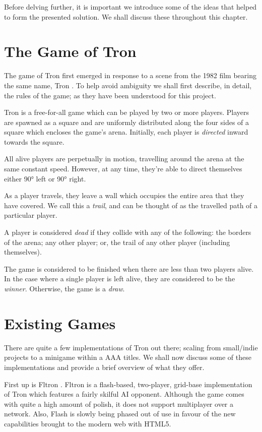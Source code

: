 \documentclass[class=article, crop=false]{standalone}
\begin{document}
	Before delving further, it is important we introduce some of the ideas that helped to form the presented solution. We shall discuss these throughout this chapter.

	\section{The Game of Tron}
		The game of Tron first emerged in response to a scene from the 1982 film bearing the same name, Tron \parencite{TronLightCycleBattle}. To help avoid ambiguity we shall first describe, in detail, the rules of the game; as they have been understood for this project.

		Tron is a free-for-all game which can be played by two or more players. Players are spawned as a square and are uniformly distributed along the four sides of a square which encloses the game's arena. Initially, each player is \emph{directed} inward towards the square.

		All alive players are perpetually in motion, travelling around the arena at the same constant speed. However, at any time, they're able to direct themselves either 90\si{\degree} left or 90\si{\degree} right.

		As a player travels, they leave a wall which occupies the entire area that they have covered. We call this a \emph{trail}, and can be thought of as the travelled path of a particular player.

		A player is considered \emph{dead} if they collide with any of the following: the borders of the arena; any other player; or, the trail of any other player (including themselves).

		The game is considered to be finished when there are less than two players alive. In the case where a single player is left alive, they are considered to be the \emph{winner}. Otherwise, the game is a \emph{draw}.

	\section{Existing Games}
		There are quite a few implementations of Tron out there; scaling from small/indie projects to a minigame within a AAA titles. We shall now discuss some of these implementations and provide a brief overview of what they offer.

		First up is Fltron \parencite{Fltron}. Fltron is a flash-based, two-player, grid-base implementation of Tron which features a fairly skilful AI opponent. Although the game comes with quite a high amount of polish, it does not support multiplayer over a network. Also, Flash is slowly being phased out of use in favour of the new capabilities brought to the modern web with HTML5. \parencite{Html5Flash} 
\end{document}
